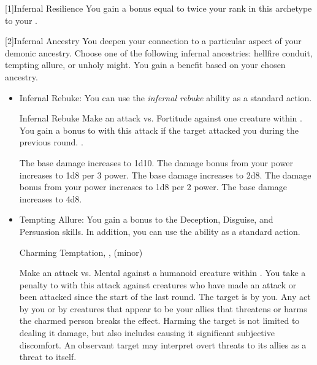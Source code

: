         [1]{Infernal Resilience} You gain a bonus equal to twice your rank in this archetype to your .

        [2]{Infernal Ancestry} You deepen your connection to a particular aspect of your demonic ancestry.
        Choose one of the following infernal ancestries: hellfire conduit, tempting allure, or unholy might.
        You gain a benefit based on your chosen ancestry.
        \begin{itemize}
            \item Infernal Rebuke: You can use the \textit{infernal rebuke} ability as a standard action.
                \begin{magicalactiveability}{Infernal Rebuke}
                    \rankline
                    Make an attack vs. Fortitude against one creature within \shortrange.
                    You gain a  bonus to  with this attack if the target attacked you during the previous round.
                    \hit {}.

                    \rankline
                     The base damage increases to 1d10.
                     The damage bonus from your power increases to 1d8 per 3 power.
                     The base damage increases to 2d8.
                     The damage bonus from your power increases to 1d8 per 2 power.
                     The base damage increases to 4d8.
                \end{magicalactiveability}
            \item Tempting Allure: You gain a  bonus to the Deception, Disguise, and Persuasion skills.
                In addition, you can use the  ability as a standard action.
                \begin{magicalsustainability}{Charming Temptation}{, ,  (minor)}
                    \rankline
                    \noindent

                    Make an attack vs. Mental against a humanoid creature within \medrange.
                    You take a  penalty to  with this attack against creatures who have made an attack or been attacked since the start of the last round.
                    \vspace{0.25em}
                    \hit The target is \charmed by you.
                    Any act by you or by creatures that appear to be your allies that threatens or harms the charmed person breaks the effect.
                    Harming the target is not limited to dealing it damage, but also includes causing it significant subjective discomfort.
                    An observant target may interpret overt threats to its allies as a threat to itself.


\end{magicalsustainability}
\end{itemize}
